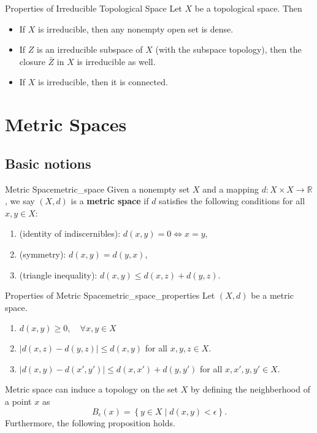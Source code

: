 \documentclass{report}
\begin{document}
\begin{proposition}{Properties of Irreducible Topological Space}{}
	Let $X$ be a topological space. Then
	\begin{itemize}
		\item If $X$ is irreducible, then any nonempty open set is dense. 
		\item If $Z$ is an irreducible subspace of $X$ (with the subspace topology), then the closure $\bar{Z}$ in $X$ is irreducible as well.
		\item If $X$ is irreducible, then it is connected.
	\end{itemize}
\end{proposition}


\section{Metric Spaces}
\subsection{Basic notions}
\begin{definition}{Metric Space}{metric_space}
	Given a nonempty set $X$ and a mapping $d:X\times X\to \mathbb{R}$, we say $(X,d)$ is a \textbf{metric space} if $d$ satisfies the following conditions for all $x,y\in X$:
	\begin{enumerate}
		\item (identity of indiscernibles): $d(x,y)=0\iff x=y$,
		\item (symmetry): $d(x,y)=d(y,x)$,
		\item (triangle inequality): $d(x,y)\le d(x,z)+d(y,z)$.
	\end{enumerate}	
\end{definition}
\begin{proposition}{Properties of Metric Space}{metric_space_properties}
	Let $(X,d)$ be a metric space.
	\begin{enumerate}
		\item $d(x,y)\ge 0,\quad\forall x,y\in X$
		\item $|d(x,z)-d(y,z)|\le d(x,y)$ for all $x,y,z\in X$.
		\item $|d(x,y)-d(x',y')|\le d(x,x')+d(y,y')$ for all $x,x',y,y'\in X$.
	\end{enumerate}
\end{proposition}
Metric space can induce a topology on the set $X$ by defining the neighberhood of a point $x$ as 
\[
	B_\epsilon(x)=\left\{y\in X\mid d(x,y)<\epsilon \right\}.
\]
Furthermore, the following proposition holds.
\end{document}
